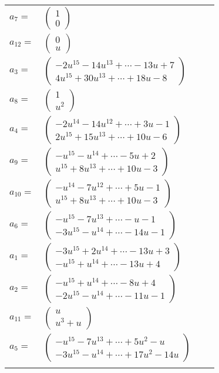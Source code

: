 \documentclass[1p]{elsarticle_modified}
\theoremstyle{definition}
\begin{document}
\begin{tabular}{m{7pt} m{180pt} m{7pt} m{180pt} }
\flushright $a_{7}=$&$\begin{pmatrix}1\\0\end{pmatrix}$ \\
\flushright $a_{12}=$&$\begin{pmatrix}0\\u\end{pmatrix}$ \\
\flushright $a_{3}=$&$\begin{pmatrix}-2 u^{15}-14 u^{13}+\cdots-13 u+7\\4 u^{15}+30 u^{13}+\cdots+18 u-8\end{pmatrix}$ \\
\flushright $a_{8}=$&$\begin{pmatrix}1\\u^2\end{pmatrix}$ \\
\flushright $a_{4}=$&$\begin{pmatrix}-2 u^{14}-14 u^{12}+\cdots+3 u-1\\2 u^{15}+15 u^{13}+\cdots+10 u-6\end{pmatrix}$ \\
\flushright $a_{9}=$&$\begin{pmatrix}- u^{15}- u^{14}+\cdots-5 u+2\\u^{15}+8 u^{13}+\cdots+10 u-3\end{pmatrix}$ \\
\flushright $a_{10}=$&$\begin{pmatrix}- u^{14}-7 u^{12}+\cdots+5 u-1\\u^{15}+8 u^{13}+\cdots+10 u-3\end{pmatrix}$ \\
\flushright $a_{6}=$&$\begin{pmatrix}- u^{15}-7 u^{13}+\cdots- u-1\\-3 u^{15}- u^{14}+\cdots-14 u-1\end{pmatrix}$ \\
\flushright $a_{1}=$&$\begin{pmatrix}-3 u^{15}+2 u^{14}+\cdots-13 u+3\\- u^{15}+u^{14}+\cdots-13 u+4\end{pmatrix}$ \\
\flushright $a_{2}=$&$\begin{pmatrix}- u^{15}+u^{14}+\cdots-8 u+4\\-2 u^{15}- u^{14}+\cdots-11 u-1\end{pmatrix}$ \\
\flushright $a_{11}=$&$\begin{pmatrix}u\\u^3+u\end{pmatrix}$ \\
\flushright $a_{5}=$&$\begin{pmatrix}- u^{15}-7 u^{13}+\cdots+5 u^2- u\\-3 u^{15}- u^{14}+\cdots+17 u^2-14 u\end{pmatrix}$\\&\end{tabular}
\end{document}
